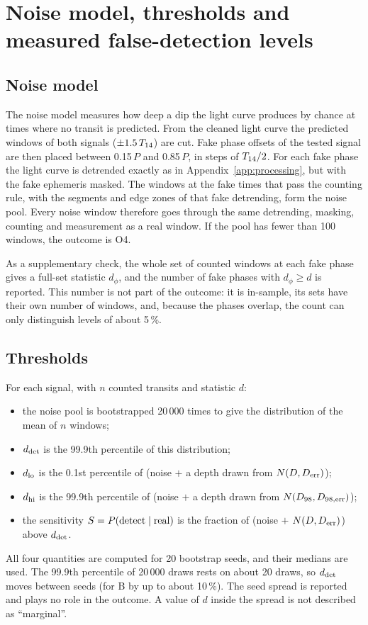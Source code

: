\section{Noise model, thresholds and measured false-detection levels} \label{app:decision}

\subsection{Noise model} \label{app:noise}

The noise model measures how deep a dip the light curve produces by chance at times where no transit is predicted.
From the cleaned light curve the predicted windows of both signals ($\pm 1.5\,T_{14}$) are cut. Fake phase offsets
of the tested signal are then placed between 0.15\,$P$ and 0.85\,$P$, in steps of $T_{14}/2$. For each fake phase
the light curve is detrended exactly as in Appendix~\ref{app:processing}, but with the fake ephemeris masked. The
windows at the fake times that pass the counting rule, with the segments and edge zones of that fake detrending, form
the noise pool. Every noise window therefore goes through the same detrending, masking, counting and measurement as a
real window. If the pool has fewer than 100 windows, the outcome is O4.

As a supplementary check, the whole set of counted windows at each fake phase gives a full-set statistic $d_\phi$, and
the number of fake phases with $d_\phi \geq d$ is reported. This number is not part of the outcome: it is in-sample, its
sets have their own number of windows, and, because the phases overlap, the count can only distinguish levels of about
5\,\%.

\subsection{Thresholds} \label{app:thresholds}

For each signal, with $n$ counted transits and statistic $d$:
\begin{itemize}
\item the noise pool is bootstrapped 20\,000 times to give the distribution of the mean of $n$ windows;
\item $d_{\rm det}$ is the 99.9th percentile of this distribution;
\item $d_{\rm lo}$ is the 0.1st percentile of (noise $+$ a depth drawn from $N(D, D_{\rm err})$);
\item $d_{\rm hi}$ is the 99.9th percentile of (noise $+$ a depth drawn from $N(D_{98}, D_{98,\rm err})$);
\item the sensitivity $S = P(\mathrm{detect} \mid \mathrm{real})$ is the fraction of (noise $+$ $N(D, D_{\rm err})$)
  above $d_{\rm det}$.
\end{itemize}
All four quantities are computed for 20 bootstrap seeds, and their medians are used. The 99.9th percentile of 20\,000
draws rests on about 20 draws, so $d_{\rm det}$ moves between seeds (for B by up to about 10\,\%). The seed spread is
reported and plays no role in the outcome. A value of $d$ inside the spread is not described as ``marginal''.

